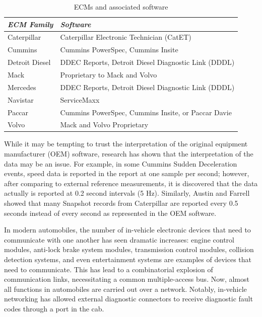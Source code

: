 \begin{table}
\centering
\begin{tabular}{|l|l|}
\hline
\emph{ECM Family} & \emph{Software}\\
\hline
Caterpillar & Caterpillar Electronic Technician (CatET)\\
\hline
Cummins & Cummins PowerSpec, Cummins Insite\\
\hline
Detroit Diesel & DDEC Reports, Detroit Diesel Diagnostic Link (DDDL)\\
\hline
Mack & Proprietary to Mack and Volvo\\
\hline
Mercedes & DDEC Reports, Detroit Diesel Diagnostic Link (DDDL)\\
\hline
Navistar & ServiceMaxx \\
\hline
Paccar & Cummins PowerSpec, Cummins Insite, or Paccar Davie\\
\hline
Volvo & Mack and Volvo Proprietary\\
\hline
\end{tabular}
\caption{ECMs and associated software}
\label{tab:software}
\end{table}
While it may be tempting to trust the interpretation of the original equipment manufacturer (OEM) software, research has shown 
that the interpretation of the data may be an issue. For example, in some Cummins Sudden Deceleration 
events, speed data is reported in the report at one sample per second; however, after comparing to 
external reference measurements, it is discovered that the data actually is reported at 0.2 second 
intervals (5 Hz)\cite{bortolin2009}. Similarly, Austin and Farrell \cite{austin2011} showed that many Snapshot records 
from Caterpillar are reported every 0.5 seconds instead of every second as represented in the OEM software.


In modern automobiles, the number of in-vehicle electronic devices that need to communicate with one another has seen dramatic increases:
engine control modules, anti-lock brake system modules, transmission control modules, collision detection systems, and even entertainment systems are examples of
devices that need to communicate. This has lead to a combinatorial explosion of communication links, necessitating a common multiple-access
bus. Now, almost all functions in automobiles are carried out over a network. Notably, in-vehicle networking has allowed external diagnostic
connectors to receive diagnostic fault codes through a port in the cab.


